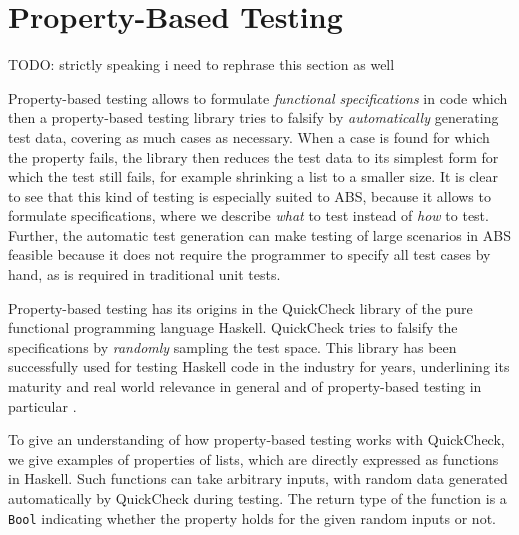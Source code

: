 \section{Property-Based Testing}
\label{sec:proptesting}
TODO: strictly speaking i need to rephrase this section as well

Property-based testing allows to formulate \textit{functional specifications} in code which then a property-based testing library tries to falsify by \textit{automatically} generating test data, covering as much cases as necessary. When a case is found for which the property fails, the library then reduces the test data to its simplest form for which the test still fails, for example shrinking a list to a smaller size. It is clear to see that this kind of testing is especially suited to ABS, because it allows to formulate specifications, where we describe \textit{what} to test instead of \textit{how} to test. %
Further, the automatic test generation can make testing of large scenarios in ABS feasible because it does not require the programmer to specify all test cases by hand, as is required in traditional unit tests.

Property-based testing has its origins in the QuickCheck library \cite{claessen_quickcheck_2000,claessen_testing_2002} of the pure functional programming language Haskell. QuickCheck tries to falsify the specifications by \textit{randomly} sampling the test space. This library has been successfully used for testing Haskell code in the industry for years, underlining its maturity and real world relevance in general and of property-based testing in particular \cite{hughes_quickcheck_2007}.



To give an understanding of how property-based testing works with QuickCheck, we give examples of properties of lists, which are directly expressed as functions in Haskell. Such functions can take arbitrary inputs, with random data generated automatically by QuickCheck during testing. The return type of the function is a \texttt{Bool} indicating whether the property holds for the given random inputs or not.

